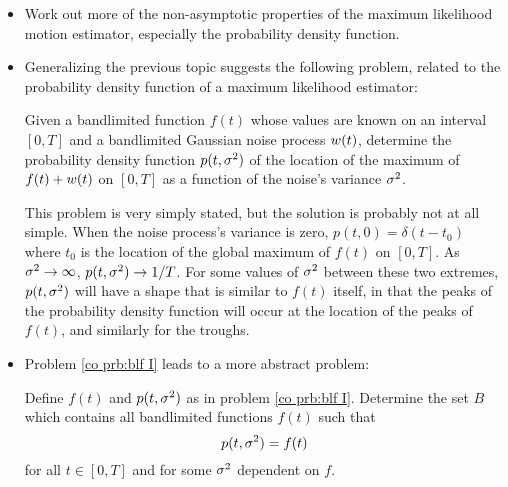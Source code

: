 \begin{itemize}
\item Work out more of the non-asymptotic properties of the maximum
likelihood motion estimator, especially the probability density function.

\item Generalizing the previous topic suggests the following problem, 
related to the probability density function of a maximum likelihood 
estimator:

\begin{problem}
\label{co prb:blf I}\mbox{}\par

Given a bandlimited function $f(t)$ whose values are known on an interval
$[0,T]$ and a bandlimited Gaussian noise process ${w}(t)$, determine the
probability density function $p(t,{\sigma^2})$ of the location of the maximum of
$f(t)+{w}(t)$ on $[0,T]$ as a function of the noise's variance ${\sigma^2}$.
\end{problem}

This problem is very simply stated, but the solution is probably not at all
simple.  When the noise process's variance is zero, $p(t,0)=\delta(t-t_0)$ 
where $t_0$ is the location of the global maximum of $f(t)$ on $[0,T]$.  As
${\sigma^2}\to\infty$, $p(t,{\sigma^2})\to 1/T$.  For some values of ${\sigma^2}$ between these
two extremes, $p(t,{\sigma^2})$ will have a shape that is similar to $f(t)$
itself, in that the peaks of the probability density function will occur at
the location of the peaks of $f(t)$, and similarly for the troughs.

\item Problem \ref{co prb:blf I} leads to a more abstract problem:

\begin{problem}
\label{co prb:blf II}\mbox{}\par

Define $f(t)$ and $p(t,{\sigma^2})$ as in problem \ref{co prb:blf I}.  Determine 
the set $B$ which contains all bandlimited functions $f(t)$ such that 
\begin{equation}
p(t,{\sigma^2})=f(t)
\end{equation}
for all $t\in[0,T]$ and for some ${\sigma^2}$ dependent on $f$.


\end{problem}
\end{itemize}

